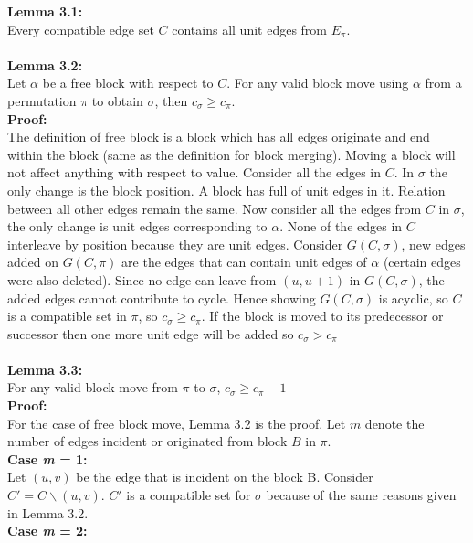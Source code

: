 \documentclass[BTech]{iitmdiss}
\begin{document}
\noindent
\textbf{Lemma 3.1:}\\
Every compatible edge set $C$ contains all unit edges from $E_{\pi}$.\\~\\
\textbf{Lemma 3.2:}\\
Let $\alpha$ be a free block with respect to $C$. For any valid block move using $\alpha$ from a permutation $\pi$ to obtain $\sigma$, then $c_\sigma \geq c_\pi$.\\
\textbf{Proof:}\\
The definition of free block is a block which has all edges originate and end within the block (same as the definition for block merging). Moving a block will not affect anything with respect to value. Consider all the edges in $C$. In $\sigma$ the only change is the block position. A block has full of unit edges in it. Relation between all other edges remain the same. Now consider all the edges from $C$ in $\sigma$, the only change is unit edges corresponding to $\alpha$. None of the edges in $C$ interleave by position because they are unit edges. Consider $G(C,\sigma)$, new edges added on $G(C,\pi)$ are the edges that can contain unit edges of $\alpha$ (certain edges were also deleted). Since no edge can leave from $(u,u+1)$ in $G(C,\sigma)$, the added edges cannot contribute to cycle. Hence showing $G(C,\sigma)$ is acyclic, so $C$ is a compatible set in $\pi$, so $c_\sigma \geq c_\pi$. If the block is moved to its predecessor or successor then one more unit edge will be added so $c_\sigma > c_\pi$\\~\\
\noindent
\textbf{Lemma 3.3:}\\
For any valid block move from $\pi$ to $\sigma$, $c_\sigma \geq c_\pi - 1$\\
\textbf{Proof:}\\
For the case of free block move, Lemma 3.2 is the proof. Let $m$ denote the number of edges incident or originated from block $B$ in $\pi$.\\
\textbf{Case \textit{m} = 1:}\\
Let $(u,v)$ be the edge that is incident on the block B. Consider $C' = C\backslash (u,v)$. $C'$ is a compatible set for $\sigma$ because of the same reasons given in Lemma 3.2.\\
\textbf{Case \textit{m} = 2:}\\
\end{document}
